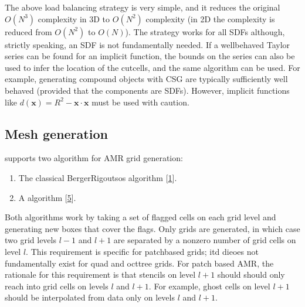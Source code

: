 \documentclass[letterpaper,10pt,english]{sphinxmanual}
\begin{document}
The above load balancing strategy is very simple, and it reduces the original \(O(N^3)\) complexity in 3D to \(O(N^2)\) complexity (in 2D the complexity is reduced from \(O(N^2)\) to \(O(N)\)).
The strategy works for all SDFs although, strictly speaking, an SDF is not fundamentally needed.
If a well\sphinxhyphen{}behaved Taylor series can be found for an implicit function, the bounds on the series can also be used to infer the location of the cut\sphinxhyphen{}cells, and the same algorithm can be used.
For example, generating compound objects with CSG are typically sufficiently well behaved (provided that the components are SDFs).
However, implicit functions like \(d\left(\mathbf{x}\right) = R^2 - \mathbf{x}\cdot\mathbf{x}\) must be used with caution.


\subsection{Mesh generation}
\label{\detokenize{Source/SpatialDiscretization:mesh-generation}}\label{\detokenize{Source/SpatialDiscretization:chap-meshgeneration}}
 supports two algorithm for AMR grid generation:
\begin{enumerate}
%
\item {} 
The classical Berger\sphinxhyphen{}Rigoutsos algorithm {[}\hyperlink{cite.ZZReferences:id38}{1}{]}.

\item {} 
A  algorithm {[}\hyperlink{cite.ZZReferences:id164}{5}{]}.

\end{enumerate}

Both algorithms work by taking a set of flagged cells on each grid level and generating new boxes that cover the flags.
Only  grids are generated, in which case two grid levels \(l-1\) and \(l+1\) are separated by a non\sphinxhyphen{}zero number of grid cells on level \(l\).
This requirement is specific for patch\sphinxhyphen{}based grids; itd dieoes not fundamentally exist for quad\sphinxhyphen{} and oct\sphinxhyphen{}tree grids.
For patch based AMR, the rationale for this requirement is that stencils on level \(l+1\) should should only reach into grid cells on levels \(l\) and \(l+1\).
For example, ghost cells on level \(l+1\) should be interpolated from data only on levels \(l\) and \(l+1\).
\end{document}
